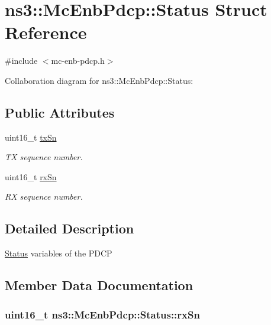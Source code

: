 \hypertarget{structns3_1_1McEnbPdcp_1_1Status}{}\section{ns3\+:\+:Mc\+Enb\+Pdcp\+:\+:Status Struct Reference}
\label{structns3_1_1McEnbPdcp_1_1Status}


{\ttfamily \#include $<$mc-\/enb-\/pdcp.\+h$>$}



Collaboration diagram for ns3\+:\+:Mc\+Enb\+Pdcp\+:\+:Status\+:
\subsection*{Public Attributes}
\begin{DoxyCompactItemize}
\item 
uint16\+\_\+t \hyperlink{structns3_1_1McEnbPdcp_1_1Status_ab6e2665b11999f6571c0207e9163d644}{tx\+Sn}
\begin{DoxyCompactList}\small\item\em TX sequence number. \end{DoxyCompactList}\item 
uint16\+\_\+t \hyperlink{structns3_1_1McEnbPdcp_1_1Status_afb0d3a85b671d9e228c7376650a3adce}{rx\+Sn}
\begin{DoxyCompactList}\small\item\em RX sequence number. \end{DoxyCompactList}\end{DoxyCompactItemize}


\subsection{Detailed Description}
\hyperlink{structns3_1_1McEnbPdcp_1_1Status}{Status} variables of the P\+D\+CP 

\subsection{Member Data Documentation}
\subsubsection[{\texorpdfstring{rx\+Sn}{rxSn}}]{\setlength{\rightskip}{0pt plus 5cm}uint16\+\_\+t ns3\+::\+Mc\+Enb\+Pdcp\+::\+Status\+::rx\+Sn}\hypertarget{structns3_1_1McEnbPdcp_1_1Status_afb0d3a85b671d9e228c7376650a3adce}{}\label{structns3_1_1McEnbPdcp_1_1Status_afb0d3a85b671d9e228c7376650a3adce}


